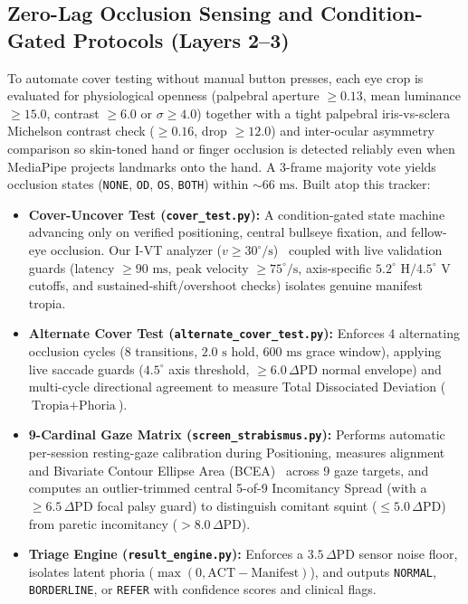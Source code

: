 \documentclass[11pt,a4paper]{article}
\begin{document}
\subsection{Zero-Lag Occlusion Sensing and Condition-Gated Protocols (Layers 2--3)}
To automate cover testing without manual button presses, each eye crop is evaluated for physiological openness (palpebral aperture $\ge 0.13$, mean luminance $\ge 15.0$, contrast $\ge 6.0$ or $\sigma \ge 4.0$) together with a tight palpebral iris-vs-sclera Michelson contrast check ($\ge 0.16$, drop $\ge 12.0$) and inter-ocular asymmetry comparison so skin-toned hand or finger occlusion is detected reliably even when MediaPipe projects landmarks onto the hand. A 3-frame majority vote yields occlusion states (\texttt{NONE}, \texttt{OD}, \texttt{OS}, \texttt{BOTH}) within $\sim 66\text{ ms}$. Built atop this tracker:
\begin{itemize}
    \item \textbf{Cover-Uncover Test (\texttt{cover\_test.py}):} A condition-gated state machine advancing only on verified positioning, central bullseye fixation, and fellow-eye occlusion. Our I-VT analyzer ($v \ge 30^\circ/\text{s}$)~\cite{ref5} coupled with live validation guards (latency $\ge 90\text{ ms}$, peak velocity $\ge 75^\circ/\text{s}$, axis-specific $5.2^\circ\text{ H}/4.5^\circ\text{ V}$ cutoffs, and sustained-shift/overshoot checks) isolates genuine manifest tropia.
    \item \textbf{Alternate Cover Test (\texttt{alternate\_cover\_test.py}):} Enforces 4 alternating occlusion cycles (8 transitions, $2.0\text{ s}$ hold, $600\text{ ms}$ grace window), applying live saccade guards ($4.5^\circ$ axis threshold, $\ge 6.0\,\Delta\text{PD}$ normal envelope) and multi-cycle directional agreement to measure Total Dissociated Deviation ($\text{Tropia} + \text{Phoria}$).
    \item \textbf{9-Cardinal Gaze Matrix (\texttt{screen\_strabismus.py}):} Performs automatic per-session resting-gaze calibration during Positioning, measures alignment and Bivariate Contour Ellipse Area (BCEA)~\cite{ref9} across 9 gaze targets, and computes an outlier-trimmed central 5-of-9 Incomitancy Spread (with a $\ge 6.5\,\Delta\text{PD}$ focal palsy guard) to distinguish comitant squint ($\le 5.0\,\Delta\text{PD}$) from paretic incomitancy ($> 8.0\,\Delta\text{PD}$).
    \item \textbf{Triage Engine (\texttt{result\_engine.py}):} Enforces a $3.5\,\Delta\text{PD}$ sensor noise floor, isolates latent phoria ($\max(0, \text{ACT} - \text{Manifest})$), and outputs \texttt{NORMAL}, \texttt{BORDERLINE}, or \texttt{REFER} with confidence scores and clinical flags.
\end{itemize}
\end{document}
